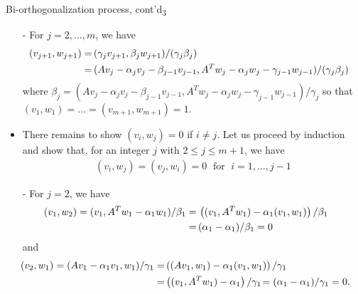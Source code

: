 \documentclass[t,usepdftitle=false]{beamer}
\begin{document}
\begin{frame}{Bi-orthogonalization process, cont'd\textsubscript{3}}
\begin{itemize}
\item[-] For $j=2,\dots,m$, we have
\begin{align*}
\hspace{-.3cm}
(v_{j+1},w_{j+1})
=&\,(\gamma_jv_{j+1},\beta_jw_{j+1})/(\gamma_j\beta_j)\\
=&\,(Av_j-\alpha_jv_j-\beta_{j-1}v_{j-1},A^Tw_j-\alpha_jw_j-\gamma_{j-1}w_{j-1})/(\gamma_j\beta_j)
\end{align*}
where $\beta_j=(Av_j-\alpha_jv_j-\beta_{j-1}v_{j-1},A^Tw_j-\alpha_jw_j-\gamma_{j-1}w_{j-1})/\gamma_j$ so that $(v_{1},w_{1})=\dots=(v_{m+1},w_{m+1})=1$.
\item There remains to show $(v_i,w_j)=0$ if $i\neq j$.
Let us proceed by induction and show that, for an integer $j$ with $2\leq j\leq m+1$, we have
\begin{align}\label{eq:bi-ortho}
(v_i,w_j)=(v_j,w_i)=0
\;\text{ for }\;i=1,\dots,j-1
\end{align}
\item[-] For $j=2$, we have
\begin{align*}
\hspace{-.5cm}
(v_1,w_2)=(v_1,A^Tw_1-\alpha_1w_1)/\beta_1=&\,\left((v_1,A^Tw_1)-\alpha_1(v_1,w_1)\right)/\beta_1\\
=&\,(\alpha_1-\alpha_1)/\beta_1=0
\end{align*}
and\vspace{-.2cm}
\begin{align*}
\hspace{-.55cm}
(v_2,w_1)=(Av_1-\alpha_1v_1,w_1)/\gamma_1=&\left((Av_1,w_1)-\alpha_1(v_1,w_1)\right)/\gamma_1\\
=&\left((v_1,A^Tw_1)-\alpha_1\right)/\gamma_1\!=(\alpha_1-\alpha_1)/\gamma_1=0.
\end{align*}
\end{itemize}
\end{frame}
\end{document}
